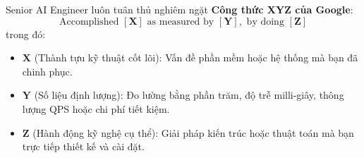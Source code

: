 Senior AI Engineer luôn tuân thủ nghiêm ngặt \textbf{Công thức XYZ của Google}:
\begin{equation}
\text{Accomplished } [\mathbf{X}] \text{ as measured by } [\mathbf{Y}], \text{ by doing } [\mathbf{Z}]
\end{equation}
trong đó:
\begin{itemize}
  \item $\mathbf{X}$ (Thành tựu kỹ thuật cốt lõi): Vấn đề phần mềm hoặc hệ thống mà bạn đã chinh phục.
  \item $\mathbf{Y}$ (Số liệu định lượng): Đo lường bằng phần trăm, độ trễ milli-giây, thông lượng QPS hoặc chi phí tiết kiệm.
  \item $\mathbf{Z}$ (Hành động kỹ nghệ cụ thể): Giải pháp kiến trúc hoặc thuật toán mà bạn trực tiếp thiết kế và cài đặt.
\end{itemize}

